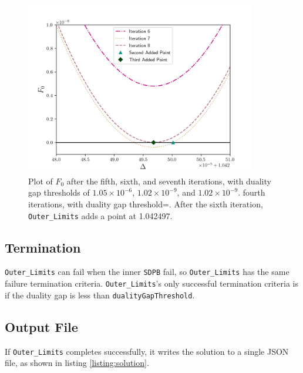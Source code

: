 \documentclass[12pt]{article}
\numberwithin{equation}{section}
\begin{document}
\begin{figure}
\begin{center}
\includegraphics[width=0.9\textwidth]{outer_plots_3}
\end{center}
\caption{Plot of $F_{0}$ after the fifth, sixth, and seventh
  iterations, with duality gap thresholds of $1.05\times10^{-6}$, $1.02\times10^{-9}$, and $1.02\times10^{-9}$.
  fourth iterations, with duality gap threshold=.  After the sixth
  iteration, \texttt{Outer\_Limits} adds a point at 1.042497.}
\label{fig:plot3}
\end{figure}

\pagebreak

\subsection{Termination}

\texttt{Outer\_Limits} can fail when the inner \texttt{SDPB} fail, so
\texttt{Outer\_Limits} has the same failure termination criteria.
\texttt{Outer\_Limits}'s only successful termination criteria is if the
duality gap is less than \texttt{dualityGapThreshold}.

\subsection{Output File}

If \texttt{Outer\_Limits} completes successfully, it writes the
solution to a single JSON file, as shown in listing
\ref{listing:solution}.
\end{document}
